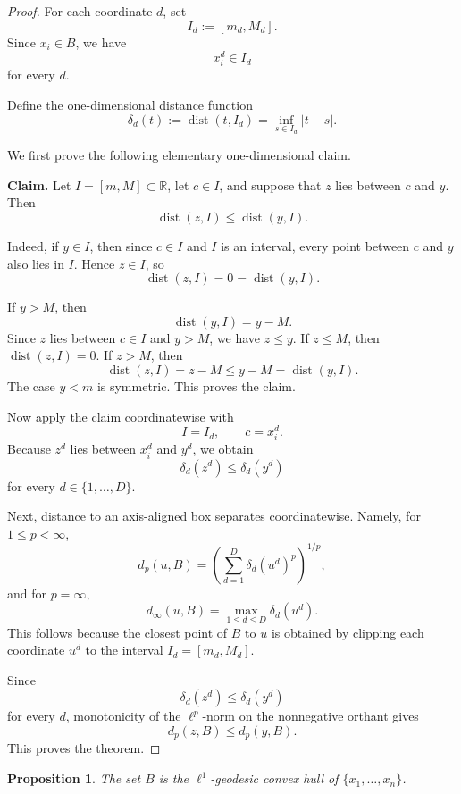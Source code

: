 \documentclass[11pt]{article}
\newtheorem{proposition}{Proposition}
\begin{document}
\begin{proof}
For each coordinate \(d\), set
\[
I_d:=[m_d,M_d].
\]
Since \(x_i\in B\), we have
\[
x_i^d\in I_d
\]
for every \(d\).

Define the one-dimensional distance function
\[
\delta_d(t):=\operatorname{dist}(t,I_d)
=
\inf_{s\in I_d}|t-s|.
\]

We first prove the following elementary one-dimensional claim.

\medskip

\noindent
\textbf{Claim.}
Let \(I=[m,M]\subset \mathbb{R}\), let \(c\in I\), and suppose that
\(z\) lies between \(c\) and \(y\). Then
\[
\operatorname{dist}(z,I)\le \operatorname{dist}(y,I).
\]

\medskip

\noindent
Indeed, if \(y\in I\), then since \(c\in I\) and \(I\) is an interval,
every point between \(c\) and \(y\) also lies in \(I\). Hence \(z\in I\), so
\[
\operatorname{dist}(z,I)=0=\operatorname{dist}(y,I).
\]

If \(y>M\), then
\[
\operatorname{dist}(y,I)=y-M.
\]
Since \(z\) lies between \(c\in I\) and \(y>M\), we have \(z\le y\). If
\(z\le M\), then \(\operatorname{dist}(z,I)=0\). If \(z>M\), then
\[
\operatorname{dist}(z,I)=z-M\le y-M=\operatorname{dist}(y,I).
\]
The case \(y<m\) is symmetric. This proves the claim.

\medskip

Now apply the claim coordinatewise with
\[
I=I_d,
\qquad
c=x_i^d.
\]
Because \(z^d\) lies between \(x_i^d\) and \(y^d\), we obtain
\[
\delta_d(z^d)\le \delta_d(y^d)
\]
for every \(d\in\{1,\dots,D\}\).

Next, distance to an axis-aligned box separates coordinatewise. Namely, for
\(1\le p<\infty\),
\[
d_p(u,B)
=
\left(
\sum_{d=1}^D \delta_d(u^d)^p
\right)^{1/p},
\]
and for \(p=\infty\),
\[
d_\infty(u,B)
=
\max_{1\le d\le D}\delta_d(u^d).
\]
This follows because the closest point of \(B\) to \(u\) is obtained by
clipping each coordinate \(u^d\) to the interval \(I_d=[m_d,M_d]\).

Since
\[
\delta_d(z^d)\le \delta_d(y^d)
\]
for every \(d\), monotonicity of the \(\ell^p\)-norm on the nonnegative
orthant gives
\[
d_p(z,B)\le d_p(y,B).
\]
This proves the theorem.
\end{proof}




\begin{proposition}
\label{prop:l1-geodesic-box-hull}
The set \(B\) is the \(\ell^1\)-geodesic convex hull of
\(\{x_1,\dots,x_n\}\).
\end{proposition}
\end{document}
